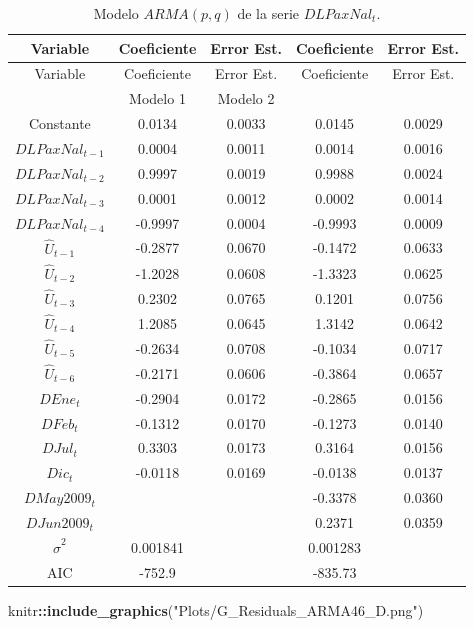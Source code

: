 \documentclass[
]{book}
\newenvironment{Shaded}{\begin{snugshade}}{\end{snugshade}}
\newcommand{\FunctionTok}[1]{\textcolor[rgb]{0.13,0.29,0.53}{\textbf{#1}}}
\newcommand{\NormalTok}[1]{#1}
\newcommand{\SpecialCharTok}[1]{\textcolor[rgb]{0.81,0.36,0.00}{\textbf{#1}}}
\newcommand{\StringTok}[1]{\textcolor[rgb]{0.31,0.60,0.02}{#1}}
\begin{document}
\begin{longtable}[]{@{}ccccc@{}}
\caption{\label{tab:ARMApq} Modelo \(ARMA(p, q)\) de la serie \(DLPaxNal_t\).}\tabularnewline
\toprule\noalign{}
Variable & Coeficiente & Error Est. & Coeficiente & Error Est. \\
\midrule\noalign{}
\endfirsthead
\toprule\noalign{}
Variable & Coeficiente & Error Est. & Coeficiente & Error Est. \\
\midrule\noalign{}
\endhead
\bottomrule\noalign{}
\endlastfoot
& Modelo 1 & Modelo 2 & & \\
Constante & 0.0134 & 0.0033 & 0.0145 & 0.0029 \\
\(DLPaxNal_{t-1}\) & 0.0004 & 0.0011 & 0.0014 & 0.0016 \\
\(DLPaxNal_{t-2}\) & 0.9997 & 0.0019 & 0.9988 & 0.0024 \\
\(DLPaxNal_{t-3}\) & 0.0001 & 0.0012 & 0.0002 & 0.0014 \\
\(DLPaxNal_{t-4}\) & -0.9997 & 0.0004 & -0.9993 & 0.0009 \\
\(\hat{U}_{t-1}\) & -0.2877 & 0.0670 & -0.1472 & 0.0633 \\
\(\hat{U}_{t-2}\) & -1.2028 & 0.0608 & -1.3323 & 0.0625 \\
\(\hat{U}_{t-3}\) & 0.2302 & 0.0765 & 0.1201 & 0.0756 \\
\(\hat{U}_{t-4}\) & 1.2085 & 0.0645 & 1.3142 & 0.0642 \\
\(\hat{U}_{t-5}\) & -0.2634 & 0.0708 & -0.1034 & 0.0717 \\
\(\hat{U}_{t-6}\) & -0.2171 & 0.0606 & -0.3864 & 0.0657 \\
\(DEne_{t}\) & -0.2904 & 0.0172 & -0.2865 & 0.0156 \\
\(DFeb_{t}\) & -0.1312 & 0.0170 & -0.1273 & 0.0140 \\
\(DJul_{t}\) & 0.3303 & 0.0173 & 0.3164 & 0.0156 \\
\(Dic_{t}\) & -0.0118 & 0.0169 & -0.0138 & 0.0137 \\
\(DMay2009_{t}\) & & & -0.3378 & 0.0360 \\
\(DJun2009_{t}\) & & & 0.2371 & 0.0359 \\
\(\hat{\sigma}^2\) & 0.001841 & & 0.001283 & \\
AIC & -752.9 & & -835.73 & \\
\end{longtable}

\begin{Shaded}
\begin{Highlighting}[]
\NormalTok{knitr}\SpecialCharTok{::}\FunctionTok{include\_graphics}\NormalTok{(}\StringTok{"Plots/G\_Residuals\_ARMA46\_D.png"}\NormalTok{) }
\end{Highlighting}
\end{Shaded}
\end{document}

